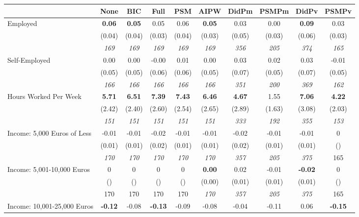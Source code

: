 \begin{tabular}{l c c c c c c c c c}
\toprule
 & None & BIC & Full & PSM & AIPW & DidPm & PSMPm & DidPv & PSMPv \\
\midrule
Employed & \textbf{ 0.06 } & \textbf{ 0.05 } & 0.05 & 0.06 & \textbf{0.05} & 0.03 & 0.00 & \textbf{ 0.09 } & 0.03 \\
& (0.04) & (0.04) & (0.03) & (0.04) & (0.03) & (0.05) & (0.03) & (0.06) & (0.03) \\
& \textit{ 169 } & \textit{ 169 } & \textit{ 169 } & \textit{ 169 } & \textit{ 169 } & \textit{ 356 } & \textit{ 205 } & \textit{ 374 } & \textit{ 165 } \\
Self-Employed & 0.00 & 0.00 & -0.00 & 0.01 & 0.00 & 0.03 & 0.02 & 0.03 & -0.01 \\
& (0.05) & (0.05) & (0.06) & (0.06) & (0.05) & (0.07) & (0.05) & (0.07) & (0.05) \\
& \textit{ 166 } & \textit{ 166 } & \textit{ 166 } & \textit{ 166 } & \textit{ 166 } & \textit{ 351 } & \textit{ 200 } & \textit{ 369 } & \textit{ 162 } \\
Hours Worked Per Week & \textbf{ 5.71 } & \textbf{ 6.51 } & \textbf{ 7.39 } & \textbf{7.43} & \textbf{6.46} & \textbf{ 4.67 } & 1.55 & \textbf{ 7.06 } & \textbf{4.22} \\
& (2.42) & (2.40) & (2.60) & (2.54) & (2.65) & (2.89) & (1.63) & (3.08) & (2.03) \\
& \textit{ 151 } & \textit{ 151 } & \textit{ 151 } & \textit{ 151 } & \textit{ 151 } & \textit{ 333 } & \textit{ 192 } & \textit{ 355 } & \textit{ 153 } \\
Income: 5,000 Euros of Less & -0.01 & -0.01 & -0.02 & -0.01 & -0.01 & -0.02 & -0.01 & -0.01 & 0 \\
& (0.01) & (0.01) & (0.02) & (0.01) & (0.01) & (0.02) & (0.01) & (0.01) & () \\
& \textit{ 170 } & \textit{ 170 } & \textit{ 170 } & \textit{ 170 } & \textit{ 170 } & \textit{ 357 } & \textit{ 205 } & \textit{ 375 } & 165 \\
Income: 5,001-10,000 Euros & 0 & 0 & 0 & 0 & \textbf{0.00} & 0.02 & -0.01 & \textbf{ -0.02 } & 0 \\
& () & () & () & () & (0.00) & (0.01) & (0.01) & (0.01) & () \\
& 170 & 170 & 170 & 170 & \textit{ 170 } & \textit{ 357 } & \textit{ 205 } & \textit{ 375 } & 165 \\
Income: 10,001-25,000 Euros & \textbf{ -0.12 } & -0.08 & \textbf{ -0.13 } & -0.09 & -0.08 & -0.04 & -0.11 & 0.06 & \textbf{-0.15} \\

\end{tabular}
